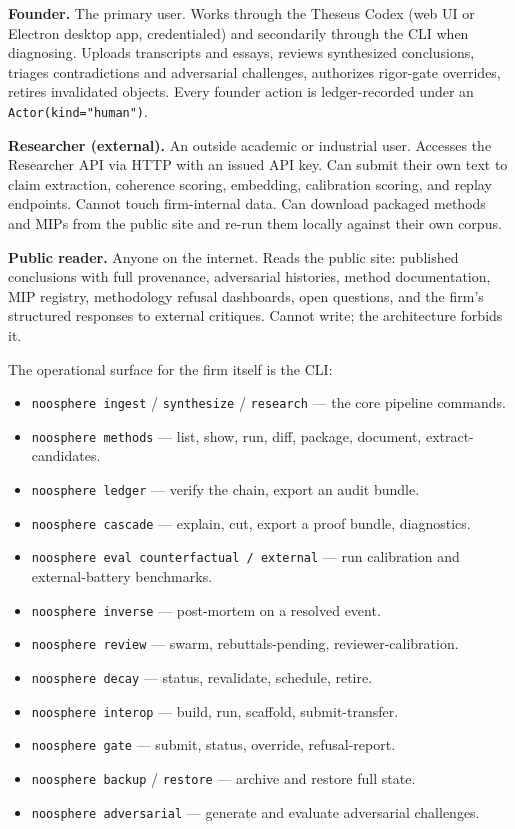 \documentclass[11pt,letterpaper]{article}
\begin{document}
\textbf{Founder.} The primary user. Works through the Theseus Codex (web UI or Electron desktop app, credentialed) and secondarily through the CLI when diagnosing. Uploads transcripts and essays, reviews synthesized conclusions, triages contradictions and adversarial challenges, authorizes rigor-gate overrides, retires invalidated objects. Every founder action is ledger-recorded under an \texttt{Actor(kind="human")}.

\textbf{Researcher (external).} An outside academic or industrial user. Accesses the Researcher API via HTTP with an issued API key. Can submit their own text to claim extraction, coherence scoring, embedding, calibration scoring, and replay endpoints. Cannot touch firm-internal data. Can download packaged methods and MIPs from the public site and re-run them locally against their own corpus.

\textbf{Public reader.} Anyone on the internet. Reads the public site: published conclusions with full provenance, adversarial histories, method documentation, MIP registry, methodology refusal dashboards, open questions, and the firm's structured responses to external critiques. Cannot write; the architecture forbids it.

The operational surface for the firm itself is the CLI:

\begin{itemize}[leftmargin=1.5em,itemsep=0.1em]
  \item \texttt{noosphere ingest} / \texttt{synthesize} / \texttt{research} --- the core pipeline commands.
  \item \texttt{noosphere methods} --- list, show, run, diff, package, document, extract-candidates.
  \item \texttt{noosphere ledger} --- verify the chain, export an audit bundle.
  \item \texttt{noosphere cascade} --- explain, cut, export a proof bundle, diagnostics.
  \item \texttt{noosphere eval counterfactual / external} --- run calibration and external-battery benchmarks.
  \item \texttt{noosphere inverse} --- post-mortem on a resolved event.
  \item \texttt{noosphere review} --- swarm, rebuttals-pending, reviewer-calibration.
  \item \texttt{noosphere decay} --- status, revalidate, schedule, retire.
  \item \texttt{noosphere interop} --- build, run, scaffold, submit-transfer.
  \item \texttt{noosphere gate} --- submit, status, override, refusal-report.
  \item \texttt{noosphere backup} / \texttt{restore} --- archive and restore full state.
  \item \texttt{noosphere adversarial} --- generate and evaluate adversarial challenges.
\end{itemize}
\end{document}
